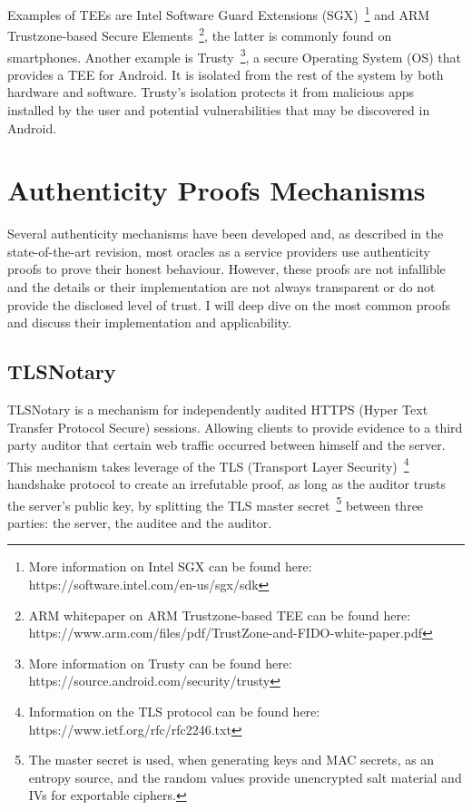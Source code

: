Examples of TEEs are Intel Software Guard Extensions (SGX)~\footnote{More information on Intel SGX can be found here: https://software.intel.com/en-us/sgx/sdk} and ARM Trustzone-based Secure Elements~\footnote{ARM whitepaper on ARM Trustzone-based TEE can be found here: https://www.arm.com/files/pdf/TrustZone-and-FIDO-white-paper.pdf}, the latter is commonly found on smartphones. Another example is Trusty~\footnote{More information on Trusty can be found here: https://source.android.com/security/trusty}, a secure Operating System (OS) that provides a TEE for Android. It is isolated from the rest of the system by both hardware and software. Trusty's isolation protects it from malicious apps installed by the user and potential vulnerabilities that may be discovered in Android.


\section{Authenticity Proofs Mechanisms}

Several authenticity mechanisms have been developed and, as described in the state-of-the-art revision, most oracles as a service providers use authenticity proofs to prove their honest behaviour. However, these proofs are not infallible and the details or their implementation are not always transparent or do not provide the disclosed level of trust. I will deep dive on the most common proofs and discuss their implementation and applicability.

\subsection{TLSNotary}\label{proof:TLSNotary}


TLSNotary is a mechanism for independently audited HTTPS (Hyper Text Transfer Protocol Secure) sessions. Allowing clients to provide evidence to a third party auditor that certain web traffic occurred between himself and the server. This mechanism takes leverage of the TLS (Transport Layer Security)~\footnote{Information on the TLS protocol can be found here: https://www.ietf.org/rfc/rfc2246.txt} handshake protocol to create an irrefutable proof, as long as the auditor trusts the server's public key, by splitting the TLS master secret~\footnote{The master secret is used, when generating keys and MAC secrets, as an entropy source, and the random values provide unencrypted salt material and IVs for exportable ciphers.} between three parties: the server, the auditee and the auditor.

